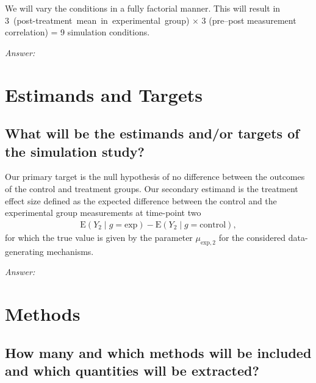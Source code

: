 \documentclass[12pt]{article}
\begin{document}
\begin{examplebox}
We will vary the conditions in a fully factorial manner. This will result in\\ \mbox{3 (post-treatment mean in experimental group)} $\times$ 3 (pre--post measurement correlation) = 9 simulation conditions.
\end{examplebox} 

\textit{Answer:}


\section{Estimands and Targets}
\subsection{What will be the estimands and/or targets of the simulation study?}      

    
\begin{examplebox}
Our primary target is the null hypothesis of no difference between the outcomes of the control and treatment groups. Our secondary estimand is the treatment effect size defined as the expected difference between the control and the experimental group measurements at time-point two
\begin{align*}
    \text{E}(Y_2 \mid g=\text{exp}) - \text{E}(Y_2 \mid g=\text{control}),
\end{align*}
for which the true value is given by the parameter $\mu_{\text{exp},2}$ for the considered data-generating mechanisms. 
\end{examplebox}  

\textit{Answer:}

\section{Methods}
\subsection{How many and which methods will be included and which quantities will be extracted?}
    
\end{document}
